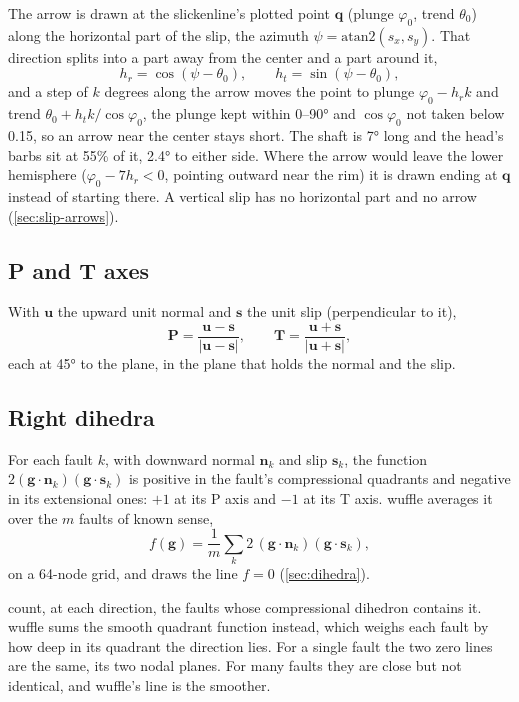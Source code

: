 The arrow is drawn at the slickenline's plotted point $\mathbf{q}$ (plunge $\varphi_0$, trend
$\theta_0$) along the horizontal part of the slip, the azimuth $\psi = \mathrm{atan2}(s_x, s_y)$. That
direction splits into a part away from the center and a part around it,
\[ h_r = \cos(\psi - \theta_0), \qquad h_t = \sin(\psi - \theta_0), \]
and a step of $k$ degrees along the arrow moves the point to plunge $\varphi_0 - h_r k$ and trend
$\theta_0 + h_t k/\cos\varphi_0$, the plunge kept within 0–90° and $\cos\varphi_0$ not taken below 0.15, so
an arrow near the center stays short. The shaft is 7° long and the head's barbs sit at 55\% of it, 2.4° to
either side. Where the arrow would leave the lower hemisphere ($\varphi_0 - 7 h_r < 0$, pointing outward
near the rim) it is drawn ending at $\mathbf{q}$ instead of starting there. A vertical slip has no
horizontal part and no arrow (\cref{sec:slip-arrows}).

\subsection{P and T axes}

With $\mathbf{u}$ the upward unit normal and $\mathbf{s}$ the unit slip (perpendicular to it),
\[ \mathbf{P} = \frac{\mathbf{u} - \mathbf{s}}{|\mathbf{u} - \mathbf{s}|}, \qquad \mathbf{T} = \frac{\mathbf{u} + \mathbf{s}}{|\mathbf{u} + \mathbf{s}|}, \]
each at 45° to the plane, in the plane that holds the normal and the slip.

\subsection{Right dihedra}\label{sec:m-dihedra}

For each fault $k$, with downward normal $\mathbf{n}_k$ and slip $\mathbf{s}_k$, the function
$2(\mathbf{g}\cdot\mathbf{n}_k)(\mathbf{g}\cdot\mathbf{s}_k)$ is positive in the fault's compressional
quadrants and negative in its extensional ones: $+1$ at its P axis and $-1$ at its T axis. wuffle
averages it over the $m$ faults of known sense,
\[ f(\mathbf{g}) = \frac{1}{m}\sum_{k} 2\,(\mathbf{g}\cdot\mathbf{n}_k)(\mathbf{g}\cdot\mathbf{s}_k), \]
on a 64-node grid, and draws the line $f = 0$ (\cref{sec:dihedra}).

\begin{note}
\textcite{angelier1977} count, at each direction, the faults whose compressional dihedron contains it.
wuffle sums the smooth quadrant function instead, which weighs each fault by how deep in its quadrant
the direction lies. For a single fault the two zero lines are the same, its two nodal planes. For many
faults they are close but not identical, and wuffle's line is the smoother.
\end{note}

